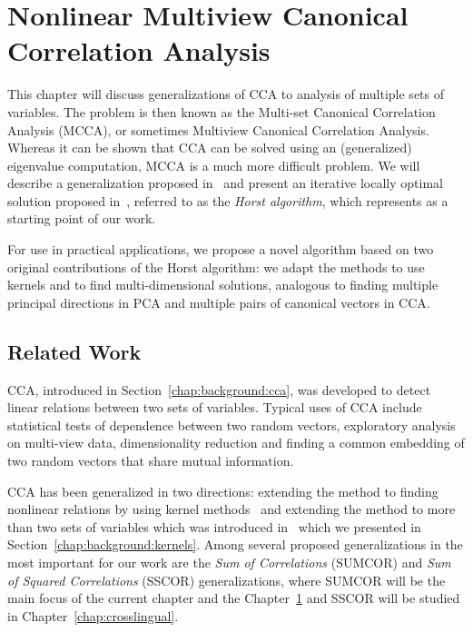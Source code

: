 %
\chapter{Nonlinear Multiview Canonical Correlation Analysis}\label{chap:extensions}

This chapter will discuss generalizations of CCA to
analysis of multiple sets of variables. The
problem is then known as the Multi-set Canonical Correlation Analysis
(MCCA), or sometimes Multiview Canonical Correlation Analysis.
Whereas it can be shown that CCA can be solved using an
(generalized) eigenvalue computation, MCCA is a much more
difficult problem. We will describe a generalization
proposed in~\cite{Kettenring} and present an iterative
locally optimal solution proposed in~\cite{Horst}, referred to
as the \emph{Horst algorithm}, which
represents as a starting point of our work.

For use in practical applications, we propose a novel algorithm based on two original contributions of the Horst algorithm: we adapt the methods to use kernels and to find
multi-dimensional solutions, analogous to finding multiple principal directions
in PCA and multiple pairs of canonical vectors in CCA.

\section{Related Work}\label{chap:extensions:related}
CCA, introduced in Section~\ref{chap:background:cca}, was developed to detect linear relations between
two sets of variables. Typical uses of CCA include statistical tests of dependence between two random vectors, exploratory
analysis on multi-view data, dimensionality reduction and finding a common embedding
of two random vectors that share mutual information.

CCA has been generalized in two directions: extending the method to finding nonlinear
relations  by using kernel methods~\cite{FBMJ}\cite{HardoonCCA} and extending the
method to more than two sets of variables which was introduced in~\cite{Kettenring} which
we presented in Section~\ref{chap:background:kernels}.
Among several proposed generalizations in \cite{Kettenring} the most important for our work are the \emph{Sum
of Correlations} (SUMCOR) and \emph{Sum of Squared Correlations} (SSCOR) generalizations, where SUMCOR
will be the main focus of the current chapter and the Chapter~\ref{chap:extensions} and SSCOR will
be studied in Chapter~\ref{chap:crosslingual}.

